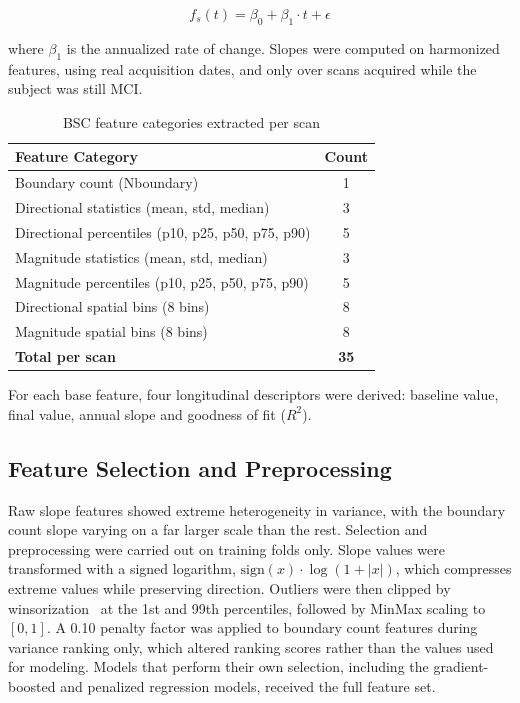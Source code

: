\documentclass[blue]{ludusofficial}  %
\begin{document}
\begin{equation}
    f_s(t) = \beta_0 + \beta_1 \cdot t + \epsilon
\end{equation}

where $\beta_1$ is the annualized rate of change. Slopes were computed on harmonized features, using real acquisition dates, and only over scans acquired while the subject was still MCI.

\begin{table}[htbp]
\centering
\caption{BSC feature categories extracted per scan}
\label{tab:bsc-features}
\begin{tabular}{lc}
\hline
\textbf{Feature Category} & \textbf{Count} \\
\hline
Boundary count (Nboundary) & 1 \\
Directional statistics (mean, std, median) & 3 \\
Directional percentiles (p10, p25, p50, p75, p90) & 5 \\
Magnitude statistics (mean, std, median) & 3 \\
Magnitude percentiles (p10, p25, p50, p75, p90) & 5 \\
Directional spatial bins (8 bins) & 8 \\
Magnitude spatial bins (8 bins) & 8 \\
\hline
\textbf{Total per scan} & \textbf{35} \\
\hline
\end{tabular}
\end{table}

For each base feature, four longitudinal descriptors were derived: baseline value, final value, annual slope and goodness of fit ($R^2$).

\subsection{Feature Selection and Preprocessing}

Raw slope features showed extreme heterogeneity in variance, with the boundary count slope varying on a far larger scale than the rest. Selection and preprocessing were carried out on training folds only. Slope values were transformed with a signed logarithm, $\text{sign}(x) \cdot \log(1 + |x|)$, which compresses extreme values while preserving direction. Outliers were then clipped by winsorization~\cite{tukey1962future} at the 1st and 99th percentiles, followed by MinMax scaling to $[0, 1]$. A 0.10 penalty factor was applied to boundary count features during variance ranking only, which altered ranking scores rather than the values used for modeling. Models that perform their own selection, including the gradient-boosted and penalized regression models, received the full feature set.
\end{document}
